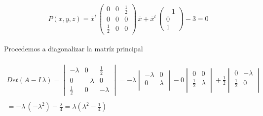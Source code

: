 \documentclass[11pt,letterpaper]{article}
\begin{document}
    \,\\
    \begin{equation*}
        P(x,y,z)=\overline{x}^t\,\begin{pmatrix}
                0 & 0 & \frac{1}{2}\\
                0 & 0 & 0\\
                \frac{1}{2} & 0 & 0
                \end{pmatrix}\,\overline{x}+\overline{x}^t\,
                \begin{pmatrix}
                -1 \\
                0\\
                1
                \end{pmatrix}-3=0
    \end{equation*}\,\\
    Procedemos a diagonalizar la matr\'iz principal\,\\
    \,\\
    \begin{align*}
        Det(A-I\,\lambda)=
            \begin{vmatrix}
                -\lambda & 0 & \frac{1}{2}\\
                0& -\lambda & 0\\
                \frac{1}{2}& 0 & -\lambda
            \end{vmatrix}=-\lambda
            \begin{vmatrix}
                -\lambda & 0 \\
                0 & \lambda \\
                \end{vmatrix}
                -0
                \begin{vmatrix}
                0 & 0 \\
                \frac{1}{2} & \lambda \\
                \end{vmatrix}
                +\frac{1}{2}
                  \begin{vmatrix}
                0 & -\lambda \\
                \frac{1}{2} & 0\\
                \end{vmatrix}\,\\
                \,\\
                =-\lambda\,(-\lambda^2)-\frac{\lambda}{4}=\lambda(\lambda^2-\frac{1}{4})
    \end{align*}\,\\
\end{document}
